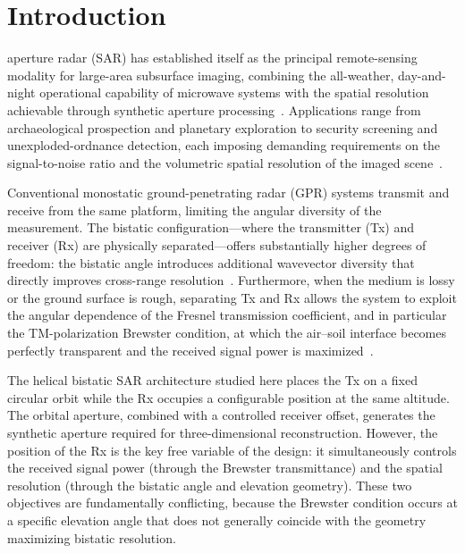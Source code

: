 \documentclass[journal]{IEEEtran}
\begin{document}
\section{Introduction}
\label{sec:intro}

 aperture radar (SAR) has established itself as the
principal remote-sensing modality for large-area subsurface imaging, combining
the all-weather, day-and-night operational capability of microwave systems with
the spatial resolution achievable through synthetic aperture
processing~\cite{moreira2013, cumming2005}. Applications range from
archaeological prospection and planetary exploration to security screening and
unexploded-ordnance detection, each imposing demanding requirements on the
signal-to-noise ratio and the volumetric spatial resolution of the
imaged scene~\cite{daniels2004, yarovoy2007}.

Conventional monostatic ground-penetrating radar (GPR) systems transmit and
receive from the same platform, limiting the angular diversity of the
measurement. The bistatic configuration—where the transmitter (Tx) and
receiver (Rx) are physically separated—offers substantially higher degrees of
freedom: the bistatic angle introduces additional wavevector diversity that
directly improves cross-range resolution~\cite{willis1991, krieger2006}.
Furthermore, when the medium is lossy or the ground surface is rough, separating
Tx and Rx allows the system to exploit the angular dependence of the Fresnel
transmission coefficient, and in particular the TM-polarization Brewster
condition, at which the air--soil interface becomes perfectly transparent and
the received signal power is maximized~\cite{born1999, balanis2012}.

The helical bistatic SAR architecture studied here places the Tx on a fixed
circular orbit while the Rx occupies a configurable position at the same
altitude. The orbital aperture, combined with a controlled receiver offset,
generates the synthetic aperture required for three-dimensional reconstruction.
However, the position of the Rx is the key free variable of the design: it
simultaneously controls the received signal power (through the Brewster
transmittance) and the spatial resolution (through the bistatic angle and
elevation geometry). These two objectives are fundamentally conflicting, because
the Brewster condition occurs at a specific elevation angle that does not
generally coincide with the geometry maximizing bistatic resolution.
\end{document}
